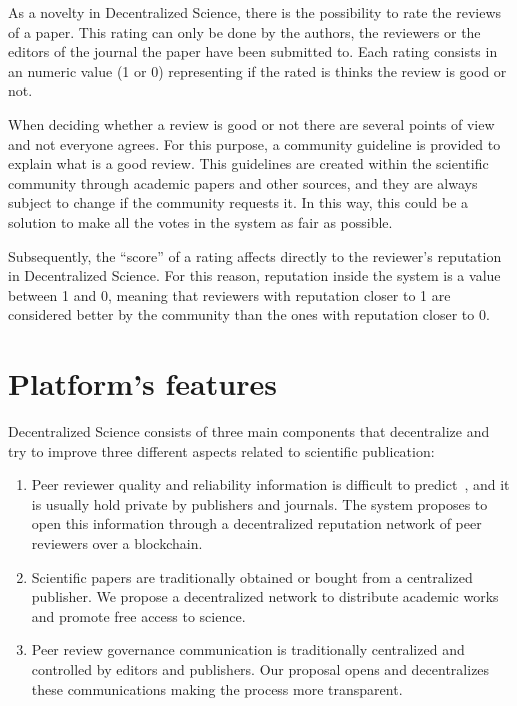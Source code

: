 \label{cha:platform-description-1}

As a novelty in Decentralized Science, there is the possibility to rate the
reviews of a paper. This rating can only be done by the authors, the reviewers
or the editors of the journal the paper have been submitted to. Each rating
consists in an numeric value (1 or 0) representing if the rated is thinks the
review is good or not.

When deciding whether a review is good or not there are several points of
view~\cite{daniel1993guardians,cole1979fair} and not everyone agrees. For
this purpose, a community guideline is provided to explain what is a good
review. This guidelines are created within the scientific community through
academic papers and other sources, and they are always subject to change if the
community requests it. In this way, this could be a solution to make all the
votes in the system as fair as possible.

Subsequently, the ``score'' of a rating affects directly to the reviewer's reputation in
Decentralized Science. For this reason, reputation inside the system is a value
between 1 and 0, meaning that reviewers with reputation closer to 1 are
considered better by the community than the ones with reputation closer to 0.


\section{Platform's features}

Decentralized Science consists of three main components that decentralize and
try to improve three different aspects related to scientific publication:
\begin{enumerate}
\item Peer reviewer quality and reliability information is difficult to
  predict~\cite{callaham_relationship_2007}, and it is usually hold private by
  publishers and journals. The system proposes to open this information through
  a decentralized reputation network of peer reviewers over a blockchain.


\item Scientific papers are traditionally obtained or bought from a centralized
  publisher. We propose a decentralized network to distribute academic works and
  promote free access to science.

\item Peer review governance communication is traditionally centralized and
  controlled by editors and publishers. Our proposal opens and decentralizes
  these communications making the process more transparent.

\end{enumerate}


